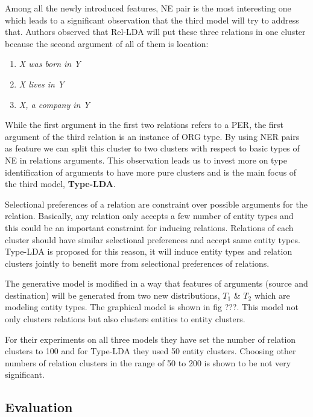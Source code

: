 \documentclass[12pt]{report}
\begin{document}
 Among all the newly introduced features, NE pair is the most interesting one which leads to a 
 significant observation that the third model will try to address that. Authors observed that 
 Rel-LDA will put these three relations in one cluster because the second argument of all of them is location:
 
 \begin{enumerate}
   \item \emph{ X was born in Y}
   \item \emph{ X lives in Y}
   \item \emph{ X, a company in Y}
 \end{enumerate}
 
 While the first argument in the first two relations refers to a PER, the first argument of the 
 third relation is an instance of ORG type. By using NER pairs as feature we can split this cluster 
 to two clusters with respect to basic types of NE in relations arguments. 
 This observation leads us to invest more on type identification of arguments to have more pure 
 clusters and is the main focus of the third model, \textbf{Type-LDA}.
 
 
 Selectional preferences of a relation are constraint over possible arguments for the relation.
  Basically, any relation only accepts a few number of entity types and this could be an important constraint
   for inducing relations. Relations of each cluster should have similar selectional preferences and
    accept same entity types. Type-LDA is proposed for this reason, it will induce entity types 
    and relation clusters jointly to benefit more from selectional preferences of relations.
    
    The generative model is modified in a way that features of arguments (source and destination)
    will be generated from two new distributions, $T_1$ \& $T_2$ which are modeling entity types. The graphical model
    is shown in fig ???. This model not only clusters relations but also clusters entities to entity clusters.
    
    For their experiments on all three models they have set the number of relation clusters to 100 and for Type-LDA they used 
     50 entity clusters. Choosing other numbers of relation clusters in the range of 50 to 200 is shown to be not very significant.
    
\subsection {Evaluation}
\label{ch:evaluation}
\end{document}
